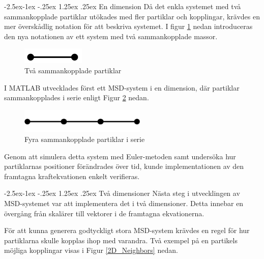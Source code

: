 \documentclass[a4paper,12pt,oneside,final,swedish]{extarticle}
\makeatletter
\renewcommand\paragraph{\@startsection{paragraph}{4}{\z@}%
            {-2.5ex\@plus -1ex \@minus -.25ex}%
            {1.25ex \@plus .25ex}%
            {\normalfont\normalsize\bfseries}}
\makeatother
\begin{document}
\paragraph{En dimension}
Då det enkla systemet med två sammankopplade partiklar utökades med fler partiklar och kopplingar, krävdes en mer överskådlig notation för att beskriva systemet. 
I figur \ref{2D_simple} nedan introduceras den nya notationen av ett system med två sammankopplade massor.

\begin{figure}[h!]
  \begin{center}
    \includegraphics[width=3cm]{Bilder/2D_simple.png} 
  \end{center}
  \caption{Två sammankopplade partiklar}
  \label{2D_simple}
\end{figure}
I MATLAB utvecklades först ett MSD-system i en dimension, där partiklar sammankopplades i serie enligt Figur \ref{simple1D4} nedan.
\begin{figure}[h!]
  \begin{center}
    \includegraphics[width=6cm]{Bilder/simple1D4.png} 
  \end{center}
  \caption{Fyra sammankopplade partiklar i serie}
  \label{simple1D4}
\end{figure}

Genom att simulera detta system med Euler-metoden samt undersöka hur partiklarnas positioner förändrades över tid, kunde implementationen av den framtagna kraftekvationen enkelt verifieras.

\paragraph{Två dimensioner}
Nästa steg i utvecklingen av MSD-systemet var att implementera det i två dimensioner. 
Detta innebar en övergång från skalärer till vektorer i de framtagna ekvationerna.
\pagebreak


För att kunna generera godtyckligt stora MSD-system krävdes en regel för hur partiklarna skulle kopplas ihop med varandra. Två exempel på en partikels möjliga kopplingar visas i Figur \ref{2D_Neighbors} nedan.
\end{document}
